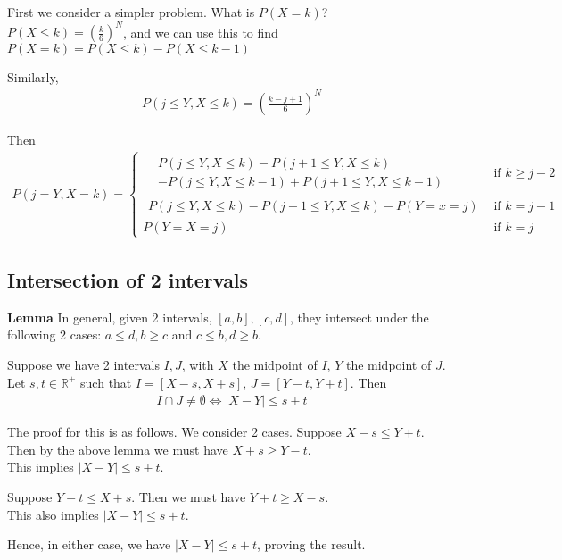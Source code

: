 \documentclass{article}
\begin{document}
First we consider a simpler problem. What is $P(X=k)$?\\
$P(X\leq k)=(\frac{k}{6})^N$, and we can use this to find $P(X=k)=P(X\leq k) - P(X\leq k-1)$

Similarly, 
\begin{align*}
	P(j\leq Y, X\leq k)=(\frac{k-j+1}{6})^N
\end{align*}

Then 
\begin{align*}
	P(j=Y, X=k) = 
	\begin{cases}
	\begin{aligned}
	&P(j\leq Y, X\leq k) - P(j+1\leq Y, X\leq k) \\
	&- P(j\leq Y, X\leq k-1) + P(j+1\leq Y, X\leq k-1)
	\end{aligned} &\text{if } k\geq j+2\\
	\begin{aligned}
	P(j\leq Y, X\leq k) - P(j+1\leq Y, X\leq k) - P(Y=x=j)
	\end{aligned} &\text{if } k=j+1\\
	P(Y=X=j) &\text{if } k=j
	\end{cases}
\end{align*}


\subsection{Intersection of 2 intervals}
\textbf{Lemma} In general, given 2 intervals, $[a,b],[c,d]$, they intersect under the following 2 cases:
$a \leq d, b \geq c$ and $c\leq b, d\geq b$.


Suppose we have 2 intervals $I,J$, with $X$ the midpoint of $I$, $Y$ the midpoint of $J$. Let $s,t\in \mathbb{R}^+$ such that $I=[X-s,X+s]$, $J=[Y-t,Y+t]$. Then 
\begin{align*}
	I\cap J\neq \emptyset \iff |X-Y| \leq s+t
\end{align*}

The proof for this is as follows. We consider 2 cases.
Suppose $X-s \leq Y+t$. Then by the above lemma we must have $X+s\geq  Y-t$.\\
This implies $|X-Y|\leq s+t$.


Suppose $Y-t \leq X+s$. Then we must have $Y+t\geq X-s$.\\
This also implies $|X-Y|\leq s+t$.

Hence, in either case, we have $|X-Y|\leq s+t$, proving the result.
\end{document}
